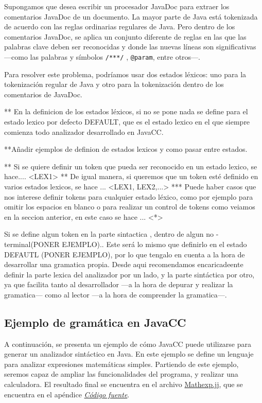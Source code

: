 Supongamos que desea escribir un procesador JavaDoc para extraer los comentarios JavaDoc de un documento. La mayor parte de Java está tokenizada de acuerdo con las reglas ordinarias regulares de Java. Pero dentro de los comentarios JavaDoc, se aplica un conjunto diferente de reglas en las que las palabras clave deben ser reconocidas y donde las nuevas líneas son significativas ---como las palabras y símbolos \lstinline|/***/| , \lstinline|@param|, entre otros---.

Para resolver este problema, podríamos usar dos estados léxicos: uno para la tokenización regular de Java y otro para la tokenización dentro de los comentarios de JavaDoc.

** En la definicion de los estados léxicos, si no se pone nada se define para el estado lexico por defecto DEFAULT, que es el estado lexico en el que siempre comienza todo analizador desarrollado en JavaCC. 

**Añadir ejemplos de definion de estados lexicos y como pasar entre estados.

** Si se quiere definir un token que pueda ser reconocido en un estado lexico, se hace.... <LEX1>
** De igual manera, si queremos que un token esté definido en varios estados lexicos, se hace ... <LEX1, LEX2,...>
*** Puede haber casos que nos interese definir tokens para cualquier estado léxico, como por ejemplo para omitir los espacios en blanco o para realizar un control de tokens como veiamos en la seccion anterior, en este caso se hace ... <*>

Si se define algun token en la parte sintactica , dentro de algun no -terminal(PONER EJEMPLO)..
Este será lo mismo que definirlo en el estado DEFAUTL (PONER EJEMPLO), por lo que tengalo en cuenta a la hora de desarrollar una gramatica propia. Desde aqui recomendamos encaricadeente definir la parte lexica del analizador por un lado, y la parte sintáctica por otro, ya que facilita tanto al desarrollador ---a la hora de depurar y realizar la gramatica--- como al lector ---a la hora de comprender la gramatica---.

\subsection{Ejemplo de gramática en JavaCC}
\noindent A continuación, se presenta un ejemplo de cómo JavaCC puede utilizarse para generar un analizador sintáctico en Java. En este ejemplo se define un lenguaje para analizar expresiones matemáticas simples. Partiendo de este ejemplo, seremos capaz de ampliar las funcionalidades del programa, y realizar una calculadora. El resultado final se encuentra en el archivo \hyperref[sec:mathexp]{Mathexp.jj}, que se encuentra en el apéndice \hyperref[sec:codigofuente]{\textit{Código fuente}}.


